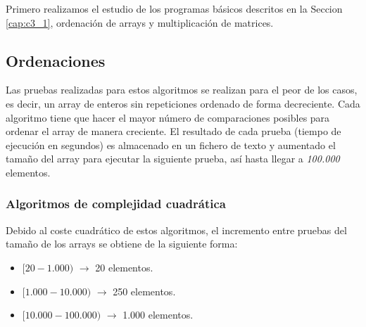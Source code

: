 Primero realizamos el estudio de los programas básicos descritos en la Seccion \ref{cap:c3_1}, ordenación de arrays y multiplicación de matrices.

	\subsection{Ordenaciones}
	
	Las pruebas realizadas para estos algoritmos se realizan para el peor de los casos, es decir, un array de enteros sin repeticiones ordenado de forma decreciente. Cada algoritmo tiene que hacer el mayor número de comparaciones posibles para ordenar el array de manera creciente. El resultado de cada prueba (tiempo de ejecución en segundos) es almacenado en un fichero de texto y aumentado el tamaño del array para ejecutar la siguiente prueba, así hasta llegar a \textit{100.000} elementos.	
	
		\subsubsection{Algoritmos de complejidad cuadrática}		
		\label{cap:4_2_1_1}
		
		Debido al coste cuadrático de estos algoritmos, el incremento entre pruebas del tamaño de los arrays se obtiene de la siguiente forma:
		\begin{itemize}
			\vspace*{-0.2cm}	
			\item \([20-1.000)\) $\rightarrow$ 20 elementos.
			\vspace*{-0.4cm}	
			\item \([1.000-10.000)\) $\rightarrow$ 250 elementos.
			\vspace*{-0.4cm}	
			\item \([10.000-100.000)\) $\rightarrow$ 1.000 elementos.					
		\end{itemize}
		
		
		
